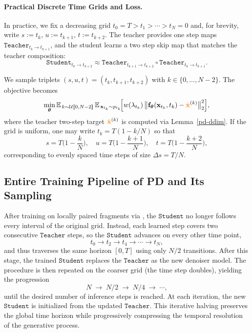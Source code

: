 \paragraph{Practical Discrete Time Grids and Loss.}
In practice, we fix a decreasing grid $t_0=T>t_1>\cdots>t_N=0$ and, for brevity, write $s:=t_k$, $u:=t_{k+1}$, $t:=t_{k+2}$.
The teacher provides one step maps $\mathtt{Teacher}_{t_k\to t_{k+1}}$, and the student learns a two step skip map that matches the teacher composition:
\[
\mathtt{Student}_{t_k\to t_{k+2}}
 \approx 
\mathtt{Teacher}_{t_{k+1}\to t_{k+2}}
\circ
\mathtt{Teacher}_{t_{k}\to t_{k+1}}.
\]

We sample triplets $(s,u,t)=(t_k,t_{k+1},t_{k+2})$ with $k\in\{0,\ldots,N-2\}$.
The objective  becomes
\[
\min_{\bm{\theta}} 
\mathbb{E}_{\,k \sim \mathcal{U}[\![0,N{-}2]\!]}\,
\mathbb{E}_{\,{\mathbf{x}}_{t_k}\sim p_{t_k}}\!
\Big[
  w(\lambda_{t_k})\,
  \big\|
  {\mathbf{f}}_{\bm{\theta}}({\mathbf{x}}_{t_k},t_k) - {\color{orange}\tilde{{\mathbf{x}}}}^{(k)}
  \big\|_2^2
\Big],
\]
where the teacher two-step target ${\color{orange}\tilde{{\mathbf{x}}}}^{(k)}$ is computed via Lemma~\ref{pd-ddim}.  If the grid is uniform, one may write $t_k = T(1 - k/N)$ so that
\[
s = T\Big(1 - \frac{k}{N}\Big),\quad
u = T\Big(1 - \frac{k+1}{N}\Big),\quad
t = T\Big(1 - \frac{k+2}{N}\Big),
\]
corresponding to evenly spaced time steps of size $\Delta s =  T/N$.


\subsection{Entire Training Pipeline of PD and Its Sampling}\label{subsec:pd-training}
After training on locally paired fragments via , the $\mathtt{Student}$ no longer follows every interval of the original grid. Instead, each learned step covers two consecutive $\mathtt{Teacher}$ steps, so the $\mathtt{Student}$ advances on every other time point,
\[
t_0 \to t_2 \to t_4 \to \cdots \to t_N,
\]
and thus traverses the same horizon $[0,T]$ using only $N/2$ transitions. After this stage, the trained $\mathtt{Student}$ replaces the $\mathtt{Teacher}$ as the new denoiser model. The procedure is then repeated on the coarser grid (the time step doubles), yielding the progression
\[
N \;\to\; N/2 \;\to\; N/4 \;\to\; \cdots,
\]
until the desired number of inference steps is reached. At each iteration, the new $\mathtt{Student}$ is initialized from the updated $\mathtt{Teacher}$. This iterative halving preserves the global time horizon while progressively compressing the temporal resolution of the generative process.

